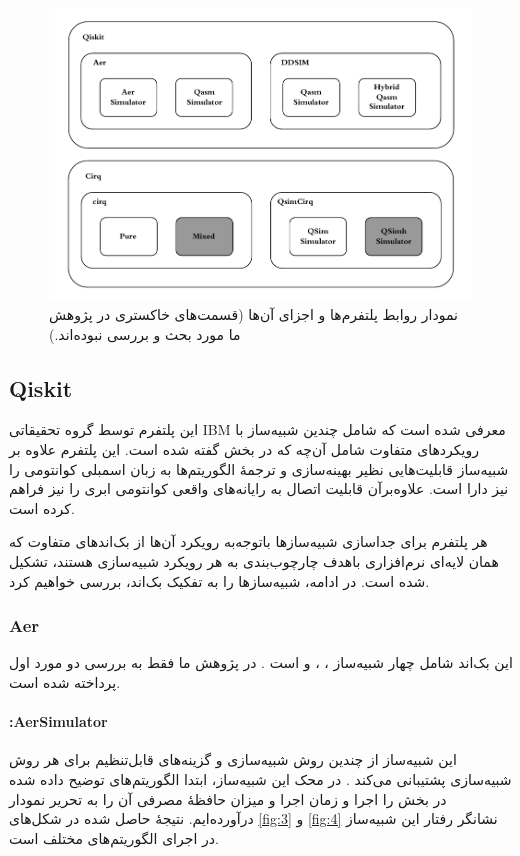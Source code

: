 \begin{figure}
 	\centering
 	\captionsetup{justification=centering,margin=2cm}
 	\includegraphics[scale=1]{images/backend_simulator_relation.pdf}
 	\caption{
 	نمودار روابط پلتفرم‌ها و اجزای آن‌ها (قسمت‌های خاکستری در پژوهش ما مورد بحث و بررسی نبوده‌اند.)
 	}
 	\label{fig:2}
 \end{figure}
 
\subsection{Qiskit}
 این پلتفرم توسط گروه تحقیقاتی IBM 
 \cite{javadi-abhari_quantum_2024}
 معرفی شده است که شامل چندین شبیه‌ساز با رویکردهای متفاوت شامل آن‌چه که در بخش
 گفته شده است. این پلتفرم علاوه بر شبیه‌ساز قابلیت‌هایی نظیر بهینه‌سازی و ترجمهٔ الگوریتم‌ها به زبان اسمبلی کوانتومی را نیز دارا است. علاوه‌برآن قابلیت اتصال به رایانه‌های واقعی کوانتومی ابری را نیز فراهم کرده است.
 
 هر پلتفرم برای جداسازی شبیه‌سازها باتوجه‌به رویکرد آن‌ها از بک‌اندهای متفاوت که همان لایه‌ای نرم‌افزاری باهدف چارچوب‌بندی به هر رویکرد شبیه‌سازی هستند، تشکیل شده است. در ادامه، شبیه‌سازها را به تفکیک بک‌اند، بررسی خواهیم کرد.
 
\subsubsection{Aer}
این بک‌اند شامل چهار شبیه‌ساز
، ،  و 
است
\cite{javadi-abhari_quantum_2024}.
در پژوهش ما فقط به بررسی دو مورد اول پرداخته شده است.

\paragraph{:AerSimulator}
این شبیه‌ساز از چندین روش شبیه‌سازی و گزینه‌های قابل‌تنظیم برای هر روش شبیه‌سازی پشتیبانی می‌کند
\cite{noauthor_aersimulator_nodate}.
در محک این شبیه‌ساز، ابتدا الگوریتم‌های توضیح داده شده در بخش
را اجرا و زمان اجرا و میزان حافظهٔ مصرفی آن را به تحریر نمودار درآورده‌ایم. نتیجهٔ حاصل شده در شکل‌های \ref{fig:3} و \ref{fig:4} نشانگر رفتار این شبیه‌ساز در اجرای الگوریتم‌های مختلف است.


